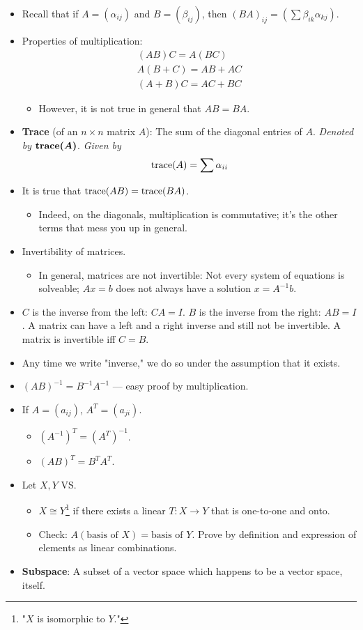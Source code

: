 \documentclass[../../notes.tex]{subfiles}
\begin{document}
\begin{itemize}
    \item Recall that if $A=(\alpha_{ij})$ and $B=(\beta_{ij})$, then $(BA)_{ij}=(\sum\beta_{ik}\alpha_{kj})$.
    \item Properties of multiplication:
    \begin{gather*}
        (AB)C = A(BC)\\
        A(B+C) = AB+AC\\
        (A+B)C = AC+BC
    \end{gather*}
    \begin{itemize}
        \item However, it is not true in general that $AB=BA$.
    \end{itemize}
    \item \textbf{Trace} (of an $n\times n$ matrix $A$): The sum of the diagonal entries of $A$. \emph{Denoted by} $\bm{\trace(A)}$. \emph{Given by}
    \begin{equation*}
        \operatorname{trace}(A) = \sum\alpha_{ii}
    \end{equation*}
    \item It is true that $\operatorname{trace}(AB)=\operatorname{trace}(BA)$.
    \begin{itemize}
        \item Indeed, on the diagonals, multiplication is commutative; it's the other terms that mess you up in general.
    \end{itemize}
    \item Invertibility of matrices.
    \begin{itemize}
        \item In general, matrices are not invertible: Not every system of equations is solveable; $Ax=b$ does not always have a solution $x=A^{-1}b$.
    \end{itemize}
    \item $C$ is the inverse from the left: $CA=I$. $B$ is the inverse from the right: $AB=I$. A matrix can have a left and a right inverse and still not be invertible. A matrix is invertible iff $C=B$.
    \item Any time we write "inverse," we do so under the assumption that it exists.
    \item $(AB)^{-1}=B^{-1}A^{-1}$ --- easy proof by multiplication.
    \item If $A=(a_{ij})$, $A^T=(a_{ji})$.
    \begin{itemize}
        \item $(A^{-1})^T=(A^T)^{-1}$.
        \item $(AB)^T=B^TA^T$.
    \end{itemize}
    \item Let $X,Y$ VS.
    \begin{itemize}
        \item $X\cong Y$\footnote{"$X$ is isomorphic to $Y$."} if there exists a linear $T:X\to Y$ that is one-to-one and onto.
        \item Check: $A(\text{basis of }X)=\text{basis of }Y$. Prove by definition and expression of elements as linear combinations.
    \end{itemize}
    \item \textbf{Subspace}: A subset of a vector space which happens to be a vector space, itself.
\end{itemize}
\end{document}
